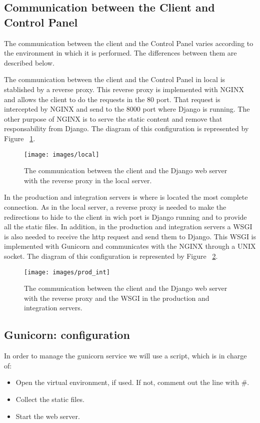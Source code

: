 \documentclass[a4paper,12pt]{article}
\begin{document}
\subsection{Communication between the Client and Control Panel}
The communication between the client and the Control Panel varies according to the environment in which it is performed.
The differences between them are described below.

The communication between the client and the Control Panel in local is stablished by a reverse proxy. This reverse proxy is implemented with
NGINX and allows the client to do the requests in the 80 port. That request is intercepted by NGINX and send to the 8000
port where Django is running. The other purpose of NGINX is to serve the static content and remove that responsability from Django.
The diagram of this configuration is represented by Figure ~\ref{fig:local_architecture}.

\begin{figure}[!ht]
    \centering
    \texttt{[image: images/local]}
    \caption{The communication between the client and the Django web server with the reverse proxy in the local server.}
    \label{fig:local_architecture}
\end{figure}

In the production and integration servers is where is located the most complete connection. As in the local server, a reverse proxy is needed to
make the redirections to hide to the client in wich port is Django running and to provide all the static files. In addition, in the production
and integration servers a WSGI is also needed to receive the http request and send them to Django. This WSGI is implemented with Gunicorn and
communicates with the NGINX through a UNIX socket. The diagram of this configuration is represented by Figure ~\ref{fig:prod_int_architecture}.


\begin{figure}[!ht]
    \centering
    \texttt{[image: images/prod\_int]}
    \caption{The communication between the client and the Django web server with the reverse proxy and the WSGI in the production and integration servers.}
    \label{fig:prod_int_architecture}
\end{figure}

\subsection{Gunicorn: configuration}
In order to manage the gunicorn service we will use a script, which is in charge of:
\begin{itemize}
    \item Open the virtual environment, if used. If not, comment out the line with \#.
    \item Collect the static files.
    \item Start the web server.
\end{itemize}
\end{document}
